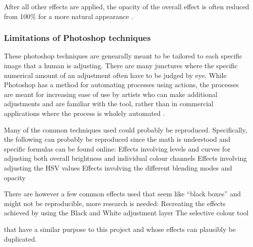 After all other effects are applied, the opacity of the overall effect is often reduced from 100\% for a more natural appearance \cite{photoshop:obama} \cite{photoshop:match_body}.

\subsubsection*{Limitations of Photoshop techniques}
These photoshop techniques are genearally meant to be tailored to each specific image that a human is adjusting. There are many junctures where the specific numerical amount of an adjustment often have to be judged by eye. While Photoshop has a method for automating processes using actions, the processes are meant for increasing ease of use by artists who can make additional adjustments and are familiar with the tool, rather than in commercial applications where the process is wholely automated \cite{photoshop:actions}. 

Many of the common techniques used could probably be reproduced. Specifically, the following can probably be reproduced since the math is understood and specific formulas can be found online: 
Effects involving levels and curves for adjusting both overall brightness and individual colour channels
Effects involving adjusting the HSV values
Effects involving the different blending modes and opacity 

There are however a few common effects used that seem like “black boxes” and might not be reproducible, more research is needed:
Recreating the effects achieved by using the Black and White adjustment layer
The selective colour tool

that have a similar purpose to this project and whose effects can plausibly be duplicated.
